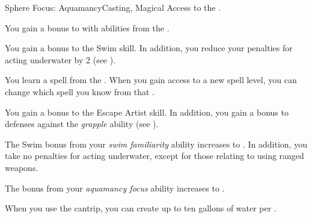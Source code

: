     \begin{feat}{Sphere Focus: Aquamancy}{Casting, Magical}
        \featpre Access to the  .

         You gain a  bonus to  with abilities from the  .

         You gain a  bonus to the Swim skill.
        In addition, you reduce your penalties for acting underwater by 2 (see ).

         You learn a spell from the  .
        When you gain access to a new spell level, you can change which spell you know from that .

         You gain a  bonus to the Escape Artist skill.
        In addition, you gain a  bonus to defenses against the \textit{grapple} ability (see ).

         The Swim bonus from your \textit{swim familiarity} ability increases to .
        In addition, you take no penalties for acting underwater, except for those relating to using ranged weapons.

         The bonus from your \textit{aquamancy focus} ability increases to .

         When you use the  cantrip, you can create up to ten gallons of water per .
    \end{feat}

